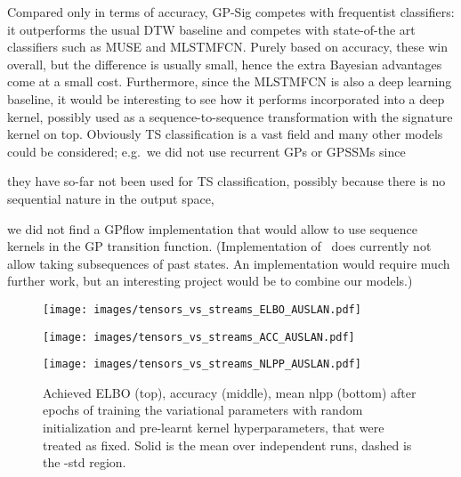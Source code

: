\documentclass{article}
\begin{document}
Compared only in terms of accuracy, GP-Sig competes with frequentist classifiers: it outperforms the usual DTW baseline and competes with state-of-the art classifiers such as MUSE and MLSTMFCN. Purely based on accuracy, these win overall, but the difference is usually small, hence the extra Bayesian advantages come at a small cost. Furthermore, since the MLSTMFCN is also a deep learning baseline, it would be interesting to see how it performs incorporated into a deep kernel, possibly used as a sequence-to-sequence transformation with the signature kernel on top. Obviously TS classification is a vast field and many other models could be considered; e.g.~we did not use recurrent GPs or GPSSMs since
\begin{enumerate*}[label=(\arabic*)]
\item 
  they have so-far not been used for TS classification, possibly because there is no sequential nature in the output space,\item we did not find a GPflow implementation that would allow to use sequence kernels in the GP transition function. (Implementation of~\cite{Ialongo2019Overcoming} does currently not allow taking subsequences of past states.
  An implementation would require much further work, but an interesting project would be to combine our models.) 
\end{enumerate*}

\begin{figure}[t] 
	\centering
	\begin{minipage}{0.55\textwidth}
		\hspace{-40pt}
		\centering
		\texttt{[image: images/tensors\_vs\_streams\_ELBO\_AUSLAN.pdf]}
\end{minipage}
	\begin{minipage}{0.55\textwidth}
		\hspace{-40pt}
		\centering
		\texttt{[image: images/tensors\_vs\_streams\_ACC\_AUSLAN.pdf]}
\end{minipage}
	\begin{minipage}{0.55\textwidth}
	    \hspace{-40pt}
		\centering
		\texttt{[image: images/tensors\_vs\_streams\_NLPP\_AUSLAN.pdf]}
\end{minipage}
\caption{Achieved ELBO (top), accuracy (middle), mean nlpp (bottom) after  epochs of training the variational parameters with random initialization and pre-learnt kernel hyperparameters, that were treated as fixed. Solid is the mean over  independent runs, dashed is the -std region.}
\label{fig:ind_tens_vs_ind_seq}
	\vspace{-10pt}
\end{figure}
\end{document}
